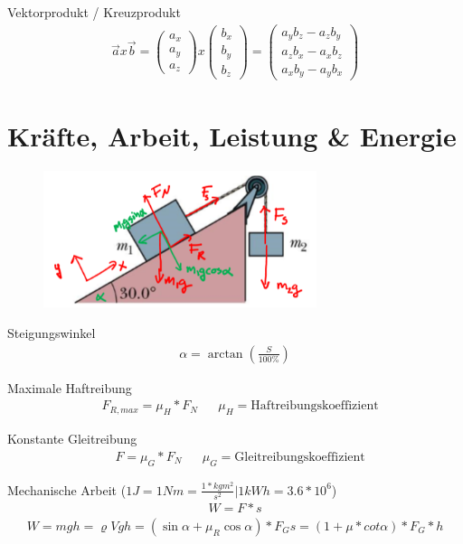 \documentclass[17pt]{extarticle}
\begin{document}
	Vektorprodukt / Kreuzprodukt
	\begin{align}
		\vec{a} x \vec{b} = 
		\begin{pmatrix} a_x \\ a_y \\ a_z \end{pmatrix}
		x
		\begin{pmatrix} b_x \\ b_y \\ b_z \end{pmatrix}
		=
		\begin{pmatrix} a_y b_z - a_z b_y \\ a_z b_x - a_x b_z \\ a_x b_y - a_y b_x \end{pmatrix}
	\end{align}
	
\section{Kräfte, Arbeit, Leistung \& Energie}
	\begin{figure}[h!]
		\centering
		\includegraphics[width=8cm]{img/Haftreibung.png}
	\end{figure}

	Steigungswinkel
	\begin{align}
		\alpha = \arctan(\frac{S}{100\%}) 
	\end{align}
		
	Maximale Haftreibung
	\begin{align}
		&F_{R,max} = \mu_{H} * F_{N}
		&&\mu_{H} = \text{Haftreibungskoeffizient} 
	\end{align}

	Konstante Gleitreibung
	\begin{align}
		&F = \mu_{G} * F_{N}
		&&\mu_{G} = \text{Gleitreibungskoeffizient}		
	\end{align}

	Mechanische Arbeit \small{($1J = 1Nm = \frac{1*kg m^{2}}{s^{2}} | 1 kWh = 3.6 * 10^6$)}
	\begin{align}
		W = F * s
	\end{align}
	\begin{align}
		W = m g h = \varrho V g h = (\sin \alpha + \mu_R \cos \alpha) * F_G s = (1 + \mu * cot \alpha) * F_G * h
	\end{align}
\end{document}
